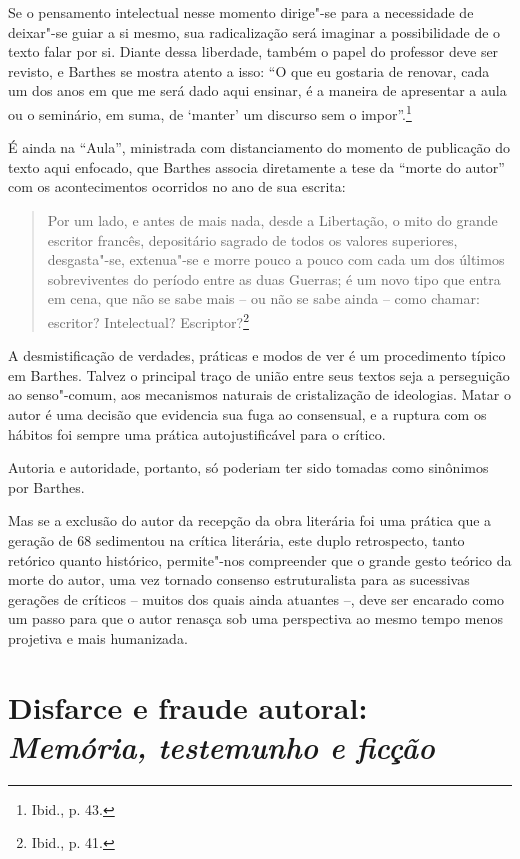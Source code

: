 Se o pensamento intelectual nesse momento dirige"-se para a necessidade
de deixar"-se guiar a si mesmo, sua radicalização será imaginar a
possibilidade de o texto falar por si. Diante dessa liberdade, também o
papel do professor deve ser revisto, e Barthes se mostra atento a isso:
``O que eu gostaria de renovar, cada um dos anos em que me será dado
aqui ensinar, é a maneira de apresentar a aula ou o seminário, em suma,
de `manter' um discurso sem o impor''.\footnote{Ibid., p. 43.}

É ainda na ``Aula'', ministrada com distanciamento do momento de
publicação do texto aqui enfocado, que Barthes associa diretamente a
tese da ``morte do autor'' com os acontecimentos ocorridos no ano de sua
escrita:

\begin{quote}
Por um lado, e antes de mais nada, desde a Libertação, o mito do grande
escritor francês, depositário sagrado de todos os valores superiores,
desgasta"-se, extenua"-se e morre pouco a pouco com cada um dos últimos
sobreviventes do período entre as duas Guerras; é um novo tipo que entra
em cena, que não se sabe mais -- ou não se sabe ainda -- como chamar:
escritor? Intelectual? Escriptor?\footnote{Ibid., p. 41.}
\end{quote}

A desmistificação de verdades, práticas e modos de ver é um procedimento
típico em Barthes. Talvez o principal traço de união entre seus textos
seja a perseguição ao senso"-comum, aos mecanismos naturais de
cristalização de ideologias. Matar o autor é uma decisão que evidencia
sua fuga ao consensual, e a ruptura com os hábitos foi sempre uma
prática autojustificável para o crítico.

Autoria e autoridade, portanto, só poderiam ter sido tomadas como
sinônimos por Barthes.

Mas se a exclusão do autor da recepção da obra literária foi uma prática
que a geração de 68 sedimentou na crítica literária, este duplo
retrospecto, tanto retórico quanto histórico, permite"-nos compreender
que o grande gesto teórico da morte do autor, uma vez tornado consenso
estruturalista para as sucessivas gerações de críticos -- muitos dos
quais ainda atuantes --, deve ser encarado como um passo para que o
autor renasça sob uma perspectiva ao mesmo tempo menos projetiva e mais
humanizada.

\chapter*{Disfarce e fraude autoral:\\ \emph{\large Memória, testemunho e ficção}}

